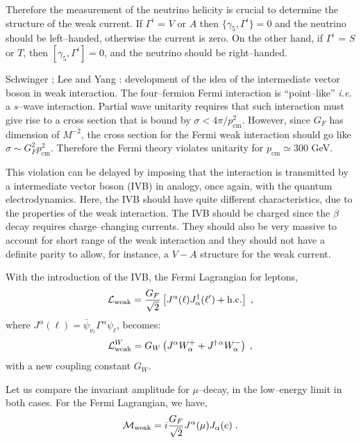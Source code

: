 \documentclass[12pt]{report}
\newcommand{\slb}[1]{\textbf{\textsl{#1}}}
\newcommand{\nin}{\noindent}
\def\text#1{{\scriptstyle\mathrm{#1}}}
\newcommand{\gc}{\gamma_5}
\newcommand{\lag}{{\cal L}}
\begin{document}
Therefore the measurement of the neutrino helicity is crucial to
determine the structure of the weak current. If $\Gamma^i$ = $V$  or
$A$ then $\{\gc, \Gamma^i\} =0$ and the neutrino should be
left--handed, otherwise the current is zero.  On the other hand, if
$\Gamma^i$ = $S$ or $T$, then $[\gc, \Gamma^i] = 0$, and the neutrino
should be right--handed. 

\nin
\fbox{\slb{1957}} Schwinger \cite{Schwinger:57}; Lee and Yang
\cite{Lee:57b}: development of the idea of the intermediate vector
boson in weak interaction. The four--fermion Fermi interaction is 
``point--like'' {\it i.e.} a $s$--wave interaction.  Partial wave
unitarity requires that such interaction must give rise to a cross
section that is bound by $\sigma < 4\pi / p^2_{\text{cm}}$. However,
since $G_F$ has dimension of $M^{-2}$, the cross section for the
Fermi weak interaction should go like $\sigma \sim G_F^2
p^2_{\text{cm}}$. Therefore the Fermi theory violates unitarity for
$p_{\text{cm}} \simeq 300$ GeV. 

This violation can be delayed by imposing that the interaction is
transmitted by a intermediate vector boson (IVB) in analogy, once
again, with the quantum electrodynamics. Here, the IVB should have
quite different characteristics, due to the properties of the weak
interaction. The IVB should be charged since the $\beta$ decay
requires charge--changing currents. They should also be very massive
to account for short range of the weak interaction and they should not
have a definite parity to allow, for instance, a $V-A$ structure for
the weak current.

With the introduction of the IVB, the Fermi Lagrangian for leptons,
\[
\lag_{\text{weak}} = \frac{G_F}{\sqrt{2}} 
\left[ J^\alpha (\ell) J_\alpha^\dagger (\ell^\prime) + \mbox{h.c.} \right]
\; , 
\]
where $J^\alpha (\ell) = \bar{\psi}_{{\nu}_\ell} \Gamma^\alpha \psi_\ell$, 
becomes:
\begin{equation}
\lag_{\text{weak}}^W = G_W 
\left( J^\alpha W_\alpha^+ +  J^{\dagger\,\alpha} W_\alpha^- \right)
\; ,
\label{l:w}
\end{equation}
with a new coupling constant $G_W$.

Let us compare the invariant amplitude for $\mu$--decay, in the
low--energy limit in both cases. For the Fermi Lagrangian, we have,
\begin{equation}
{\cal M}_{\text{weak}} = i
{ \frac{G_F}{\sqrt{2}} } J^{\alpha}{(\mu)} J_{\alpha} (e) \; .
\label{amp:fer}
\end{equation}
\end{document}
